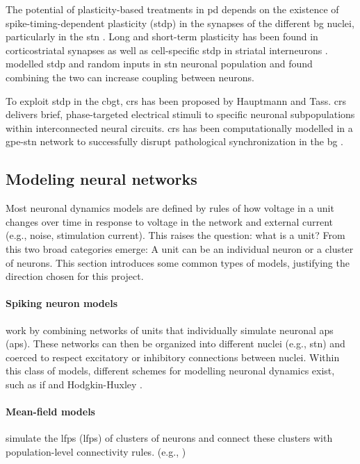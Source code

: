 The potential of plasticity-based treatments in \acrshort{pd} depends on the existence of
spike-timing-dependent plasticity (\acrshort{stdp}) in the synapses of the different \acrshort{bg} nuclei, particularly
in the \acrshort{stn} \cite{rubin2012basal}. Long and short-term plasticity has been found in
corticostriatal synapses \cite{kreitzer2008striatal, di2009short} as well as cell-specific \acrshort{stdp} in
striatal interneurons \cite{fino2010spike}.
\cite{thieu2024role} modelled \acrshort{stdp} and random inputs in \acrshort{stn} neuronal population and found combining the two can
increase coupling between neurons.

To exploit \acrshort{stdp} in the \acrshort{cbgt}, \acrfull{crs} has been proposed by Hauptmann and Tass.
\acrshort{crs} delivers brief, phase-targeted electrical stimuli to specific neuronal subpopulations within interconnected
neural circuits.
\acrshort{crs} has been computationally modelled in a \acrfull{gpe}-\acrshort{stn} network to successfully disrupt pathological
synchronization in the \acrshort{bg} \cite{hauptmann2009cumulative, hauptmann2010restoration}.

\subsection{Modeling neural networks}
Most neuronal dynamics models are defined by rules of how voltage in a unit changes
over time in response to voltage in the network and external current (e.g., noise, stimulation
current).
This raises the question: what is a unit? From this two broad categories emerge: A unit can be an individual neuron or a cluster of neurons. This section introduces
some common types of models, justifying the direction chosen for this project.

\paragraph{Spiking neuron models} work by combining networks of units that individually
simulate neuronal \acrlong{ap}s (\acrshort{ap}s).
These networks can then be organized into different nuclei (e.g., \acrshort{stn}) and coerced to respect
excitatory or inhibitory connections between nuclei.
Within this class of models, different schemes for modelling neuronal dynamics exist,
such as \acrfull{if} \cite{gerstner2014if} and Hodgkin-Huxley
\cite{hodgkin1952measurement, gerstner2014hh}.

\paragraph{Mean-field models} simulate the \acrlong{lfp}s (\acrshort{lfp}s) of clusters of neurons
and connect these clusters with population-level connectivity rules. (e.g.,
\cite{jansen1995electroencephalogram, west2022stimulating})

